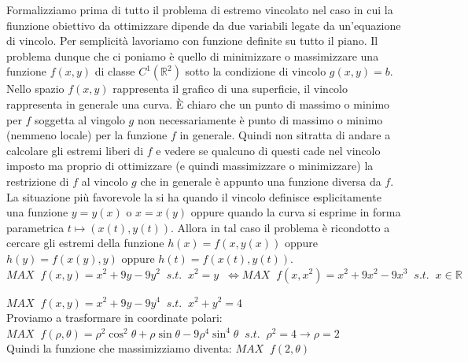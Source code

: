\documentclass[a4paper]{article}
\numberwithin{equation}{subsection}
\begin{document}
Formalizziamo prima di tutto il problema di estremo vincolato nel caso in cui la fiunzione obiettivo
da ottimizzare dipende da due variabili legate da un'equazione di vincolo.
Per semplicità lavoriamo con funzione definite su tutto il piano. 
Il problema dunque che ci poniamo è quello di minimizzare o massimizzare una funzione $f(x,y)$ 
di classe $C^1(\mathbb{R}^2)$ sotto la condizione di vincolo $g(x,y) = b$.
Nello spazio $f(x,y)$ rappresenta il grafico di una superficie, il vincolo rappresenta in generale una curva.
È chiaro che un punto di massimo o minimo per $f$ soggetta al vingolo $g$ non necessariamente è punto di massimo o minimo (nemmeno locale)
per la funzione $f$ in generale. Quindi non sitratta di andare a calcolare gli estremi liberi di $f$ e vedere
se qualcuno di questi cade nel vincolo imposto ma proprio di ottimizzare (e quindi massimizzare o minimizzare) la restrizione di $f$
al vincolo $g$ che in generale è appunto una funzione diversa da $f$.
La situazione più favorevole la si ha quando il vincolo definisce esplicitamente una funzione $y = y(x)$ o $x = x(y)$ oppure quando la curva 
si esprime in forma parametrica $t \mapsto (x(t), y(t))$.
Allora in tal caso il problema è ricondotto a cercare gli estremi della funzione $h(x) = f(x,y(x))$ oppure $h(y) = f(x(y),y)$ oppure $h(t) = f(x(t),y(t))$.
\ex{}
{
    $MAX \; \; f(x,y) = x^2 + 9y - 9y^2 \; \;  s.t. \; \; x^2 = y \; \; \Longleftrightarrow MAX \; \; f(x,x^2) = x^2 + 9x^2 - 9x^3 \; \;  s.t. \; \; x \in \mathbb{R} \; \;$
}
\ex{}
{
    \begin{center}
       $ MAX \; \; f(x,y) = x^2 + 9y - 9y^4 \; \;  s.t. \; \; x^2  + y^2 = 4  \; \;$\\
       Proviamo a trasformare in coordinate polari:\\
       $ MAX \; \; f(\rho,\theta) = \rho^2\cos^2{\theta} + \rho\sin{\theta} - 9\rho^4\sin^4{\theta} \; \;  s.t.\; \;  \rho^2 = 4 \rightarrow \rho = 2$\\
       Quindi la funzione che massimizziamo diventa:
    $MAX \; \; f(2,\theta)$
    \end{center}
}
\end{document}
